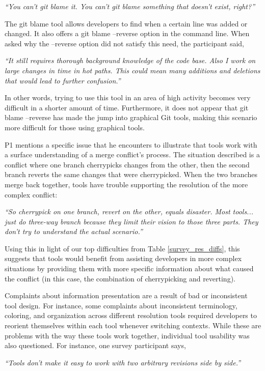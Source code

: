 \begin{displayquote}
\textit{``You can't git blame it. You can't git blame something that doesn't exist, right?''}
\end{displayquote}

The git blame tool allows developers to find when a certain line was added or changed. It also offers a git blame --reverse option in the command line. When asked why the --reverse option did not satisfy this need, the participant said, 

\begin{displayquote}
\textit{``It still requires thorough background knowledge of the code base. Also I work on large changes in time in hot paths. This could mean many additions and deletions that would lead to further confusion.''}
\end{displayquote}

 In other words, trying to use this tool in an area of high activity becomes very difficult in a shorter amount of time. Furthermore, it does not appear that git blame --reverse has made the jump into graphical Git tools, making this scenario more difficult for those using graphical tools.
 
 P1 mentions a specific issue that he encounters to illustrate that tools work with a surface understanding of a merge conflict's process. The situation described is a conflict where one branch cherrypicks changes from the other, then the second branch reverts the same changes that were cherrypicked. When the two branches merge back together, tools have trouble supporting the resolution of the more complex conflict:
 \begin{displayquote}
 \textit{``So cherrypick on one branch, revert on the other, equals disaster. Most tools... just do three-way branch because they limit their vision to those three parts. They don't try to understand the actual scenario.''}
 \end{displayquote}
 Using this in light of our top difficulties from Table \ref{survey_res_diffs}, this suggests that tools would benefit from assisting developers in more complex situations by providing them with more specific information about what caused the conflict (in this case, the combination of cherrypicking and reverting). 


Complaints about information presentation are a result of bad or inconsistent tool design. For instance, some complaints about inconsistent terminology, coloring, and organization across different resolution tools required developers to reorient themselves within each tool whenever switching contexts. While these are problems with the way these tools work together, individual tool usability was also questioned. For instance, one survey participant says, 
\begin{displayquote}
\textit{``Tools don't make it easy to work with two arbitrary revisions side by side.''}
\end{displayquote}

